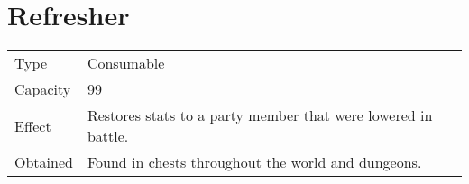 \section{Refresher}
\label{item:refresher}


\noindent\begin{tabularx}{\textwidth}[l]{lX}
	Type
	& Consumable
\\
	Capacity
	& 99
\\
	Effect
	& Restores stats to a party member that were lowered in battle.
\\
	Obtained
	& Found in chests throughout the world and dungeons.
\end{tabularx}
